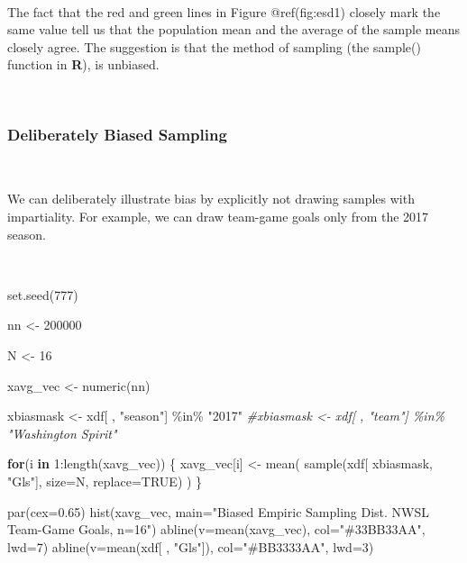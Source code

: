\documentclass[
]{article}
\newenvironment{Shaded}{\begin{snugshade}}{\end{snugshade}}
\newcommand{\AttributeTok}[1]{\textcolor[rgb]{0.77,0.63,0.00}{#1}}
\newcommand{\CommentTok}[1]{\textcolor[rgb]{0.56,0.35,0.01}{\textit{#1}}}
\newcommand{\ConstantTok}[1]{\textcolor[rgb]{0.00,0.00,0.00}{#1}}
\newcommand{\ControlFlowTok}[1]{\textcolor[rgb]{0.13,0.29,0.53}{\textbf{#1}}}
\newcommand{\DecValTok}[1]{\textcolor[rgb]{0.00,0.00,0.81}{#1}}
\newcommand{\FloatTok}[1]{\textcolor[rgb]{0.00,0.00,0.81}{#1}}
\newcommand{\FunctionTok}[1]{\textcolor[rgb]{0.00,0.00,0.00}{#1}}
\newcommand{\NormalTok}[1]{#1}
\newcommand{\OtherTok}[1]{\textcolor[rgb]{0.56,0.35,0.01}{#1}}
\newcommand{\SpecialCharTok}[1]{\textcolor[rgb]{0.00,0.00,0.00}{#1}}
\newcommand{\StringTok}[1]{\textcolor[rgb]{0.31,0.60,0.02}{#1}}
\begin{document}
~~

The fact that the red and green lines in Figure @ref(fig:esd1) closely
mark the same value tell us that the population mean and the average of
the sample means closely agree. The suggestion is that the method of
sampling (the sample() function in \textbf{R}), is unbiased.

~~

\hypertarget{deliberately-biased-sampling}{%
\subsubsection{Deliberately Biased
Sampling}\label{deliberately-biased-sampling}}

~~

We can deliberately illustrate bias by explicitly not drawing samples
with impartiality. For example, we can draw team-game goals only from
the 2017 season.

~~

\begin{Shaded}
\begin{Highlighting}[]
\FunctionTok{set.seed}\NormalTok{(}\DecValTok{777}\NormalTok{)}

\NormalTok{nn }\OtherTok{\textless{}{-}} \DecValTok{200000}

\NormalTok{N }\OtherTok{\textless{}{-}} \DecValTok{16}

\NormalTok{xavg\_vec }\OtherTok{\textless{}{-}} \FunctionTok{numeric}\NormalTok{(nn)}

\NormalTok{xbiasmask }\OtherTok{\textless{}{-}}\NormalTok{ xdf[ , }\StringTok{"season"}\NormalTok{] }\SpecialCharTok{\%in\%} \StringTok{"2017"}
\CommentTok{\#xbiasmask \textless{}{-} xdf[ , "team"] \%in\% "Washington Spirit"}

\ControlFlowTok{for}\NormalTok{(i }\ControlFlowTok{in} \DecValTok{1}\SpecialCharTok{:}\FunctionTok{length}\NormalTok{(xavg\_vec)) \{}
\NormalTok{    xavg\_vec[i] }\OtherTok{\textless{}{-}} \FunctionTok{mean}\NormalTok{( }\FunctionTok{sample}\NormalTok{(xdf[ xbiasmask, }\StringTok{"Gls"}\NormalTok{], }\AttributeTok{size=}\NormalTok{N, }\AttributeTok{replace=}\ConstantTok{TRUE}\NormalTok{) )}
\NormalTok{\}}
\end{Highlighting}
\end{Shaded}

\begin{Shaded}
\begin{Highlighting}[]
\FunctionTok{par}\NormalTok{(}\AttributeTok{cex=}\FloatTok{0.65}\NormalTok{)}
\FunctionTok{hist}\NormalTok{(xavg\_vec, }\AttributeTok{main=}\StringTok{"Biased Empiric Sampling Dist. NWSL Team{-}Game Goals, n=16"}\NormalTok{)}
\FunctionTok{abline}\NormalTok{(}\AttributeTok{v=}\FunctionTok{mean}\NormalTok{(xavg\_vec), }\AttributeTok{col=}\StringTok{"\#33BB33AA"}\NormalTok{, }\AttributeTok{lwd=}\DecValTok{7}\NormalTok{)}
\FunctionTok{abline}\NormalTok{(}\AttributeTok{v=}\FunctionTok{mean}\NormalTok{(xdf[ , }\StringTok{"Gls"}\NormalTok{]), }\AttributeTok{col=}\StringTok{"\#BB3333AA"}\NormalTok{, }\AttributeTok{lwd=}\DecValTok{3}\NormalTok{)}
\end{Highlighting}
\end{Shaded}
\end{document}
